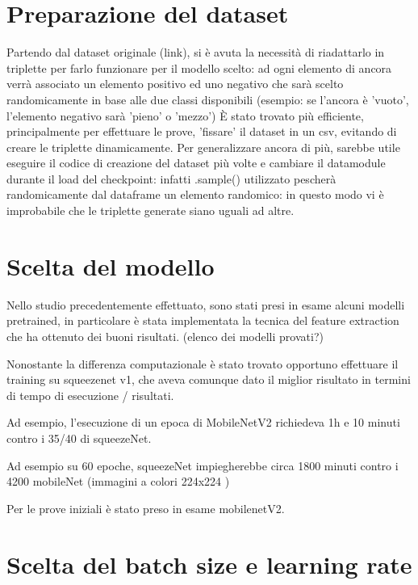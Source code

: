 \documentclass[11pt]{article}
\begin{document}

\section{Preparazione del dataset}

Partendo dal dataset originale (link), si è avuta la necessità di riadattarlo in triplette per farlo funzionare per il modello scelto: ad ogni elemento di ancora verrà associato un elemento positivo ed uno negativo che sarà scelto randomicamente in base alle due classi disponibili (esempio: se l'ancora è 'vuoto', l'elemento negativo sarà 'pieno' o 'mezzo')
È stato trovato più efficiente, principalmente per effettuare le prove, 'fissare' il dataset in un csv, evitando di creare le triplette dinamicamente. Per generalizzare ancora di più, sarebbe utile eseguire il codice di creazione del dataset più volte e cambiare il datamodule durante il load del checkpoint: infatti .sample() utilizzato pescherà randomicamente dal dataframe un elemento randomico: in questo modo vi è improbabile che le triplette generate siano uguali ad altre.

\section{Scelta del modello }

Nello studio precedentemente effettuato, sono stati presi in esame alcuni modelli pretrained, in particolare è stata implementata la tecnica del feature extraction che ha ottenuto dei buoni risultati. (elenco dei modelli provati?)

Nonostante la differenza computazionale è stato trovato opportuno effettuare il training su squeezenet v1, che aveva comunque dato il miglior risultato in termini di tempo di esecuzione / risultati.

Ad esempio, l'esecuzione di un epoca di MobileNetV2 richiedeva 1h e 10 minuti contro i 35/40 di squeezeNet. 

Ad esempio su 60 epoche, squeezeNet impiegherebbe circa 1800 minuti contro i 4200 mobileNet (immagini a colori 224x224 )

Per le prove iniziali è stato preso in esame mobilenetV2.

\section{Scelta del batch size e learning rate}
\end{document}
